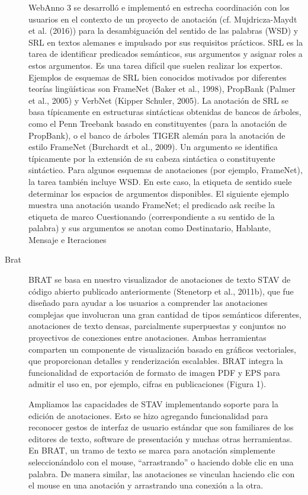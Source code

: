 \begin{description}
WebAnno 3 se desarrolló e implementó en estrecha coordinación con los usuarios en el contexto de un proyecto de anotación (cf. Mujdricza-Maydt et al. (2016)) para la desambiguación del sentido de las palabras (WSD) y SRL en textos alemanes e impulsado por sus requisitos prácticos. SRL es la tarea de identificar predicados semánticos, sus argumentos y asignar roles a estos argumentos. Es una tarea difícil que suelen realizar los expertos.
Ejemplos de esquemas de SRL bien conocidos motivados por diferentes teorías lingüísticas son FrameNet (Baker et al., 1998), PropBank (Palmer et al., 2005) y VerbNet (Kipper Schuler, 2005). La anotación de SRL se basa típicamente en estructuras sintácticas obtenidas de bancos de árboles, como el Penn Treebank basado en constituyentes (para la anotación de PropBank), o el banco de árboles TIGER alemán para la anotación de estilo FrameNet (Burchardt et al., 2009). Un argumento se identifica típicamente por la extensión de su cabeza sintáctica o constituyente sintáctico. Para algunos esquemas de anotaciones (por ejemplo, FrameNet), la tarea también incluye WSD. En este caso, la etiqueta de sentido suele determinar los espacios de argumentos disponibles. El siguiente ejemplo muestra una anotación usando FrameNet; el predicado ask recibe la etiqueta de marco Cuestionando (correspondiente a su sentido de la palabra) y sus argumentos se anotan como Destinatario, Hablante, Mensaje e Iteraciones

\item[Brat]

BRAT se basa en nuestro visualizador de anotaciones de texto STAV de código abierto publicado anteriormente (Stenetorp et al., 2011b), que fue diseñado para ayudar a los usuarios a comprender las anotaciones complejas que involucran una gran cantidad de tipos semánticos diferentes, anotaciones de texto densas, parcialmente superpuestas y conjuntos no proyectivos de conexiones entre anotaciones. Ambas herramientas comparten un componente de visualización basado en gráficos vectoriales, que proporcionan detalles y renderización escalables. BRAT integra la funcionalidad de exportación de formato de imagen PDF y EPS para admitir el uso en, por ejemplo, cifras en publicaciones (Figura 1).

Ampliamos las capacidades de STAV implementando soporte para la edición de anotaciones. Esto se hizo agregando funcionalidad para reconocer gestos de interfaz de usuario estándar que son familiares de los editores de texto, software de presentación y muchas otras herramientas.
En BRAT, un tramo de texto se marca para anotación simplemente seleccionándolo con el mouse, “arrastrando” o haciendo doble clic en una palabra. De manera similar, las anotaciones se vinculan haciendo clic con el mouse en una anotación y arrastrando una conexión a la otra.


\end{description}
